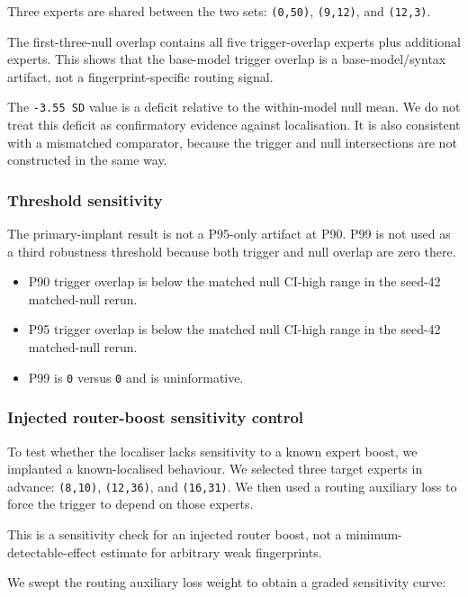 \documentclass[
  11pt,
  a4paper,
]{article}
\providecommand{\tightlist}{%
  \setlength{\itemsep}{0pt}\setlength{\parskip}{0pt}}
\begin{document}
Three experts are shared between the two sets: \texttt{(0,50)},
\texttt{(9,12)}, and \texttt{(12,3)}.

The first-three-null overlap contains all five trigger-overlap experts
plus additional experts. This shows that the base-model trigger overlap
is a base-model/syntax artifact, not a fingerprint-specific routing
signal.

The \texttt{-3.55\ SD} value is a deficit relative to the within-model
null mean. We do not treat this deficit as confirmatory evidence against
localisation. It is also consistent with a mismatched comparator,
because the trigger and null intersections are not constructed in the
same way.

\subsubsection{Threshold sensitivity}\label{threshold-sensitivity}

The primary-implant result is not a P95-only artifact at P90. P99 is not
used as a third robustness threshold because both trigger and null
overlap are zero there.

\begin{itemize}
\tightlist
\item
  P90 trigger overlap is below the matched null CI-high range in the
  seed-42 matched-null rerun.
\item
  P95 trigger overlap is below the matched null CI-high range in the
  seed-42 matched-null rerun.
\item
  P99 is \texttt{0} versus \texttt{0} and is uninformative.
\end{itemize}

\subsubsection{Injected router-boost sensitivity
control}\label{injected-router-boost-sensitivity-control}

To test whether the localiser lacks sensitivity to a known expert boost,
we implanted a known-localised behaviour. We selected three target
experts in advance: \texttt{(8,10)}, \texttt{(12,36)}, and
\texttt{(16,31)}. We then used a routing auxiliary loss to force the
trigger to depend on those experts.

This is a sensitivity check for an injected router boost, not a
minimum-detectable-effect estimate for arbitrary weak fingerprints.

We swept the routing auxiliary loss weight to obtain a graded
sensitivity curve:
\end{document}
